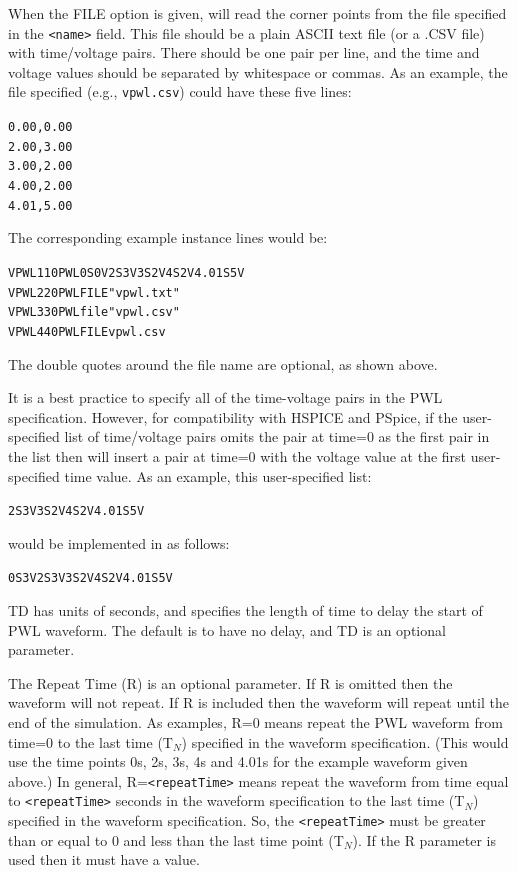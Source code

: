 When the FILE option is given, \Xyce{} will read the corner points
from the file specified in the \texttt{<name>} field.  This file
should be a plain ASCII text file (or a .CSV file) with time/voltage pairs.  
There should be one pair per line, and the time and voltage values should be
separated by whitespace or commas. As an example, the file 
specified (e.g., \texttt{vpwl.csv}) could have these five lines:
\begin{alltt}
0.00, 0.00
2.00, 3.00
3.00, 2.00
4.00, 2.00
4.01, 5.00
\end{alltt}
The corresponding example instance lines would be:
\begin{alltt}
VPWL1 1 0 PWL 0S 0V  2S 3V  3S 2V  4S 2V  4.01S 5V
VPWL2 2 0 PWL FILE "vpwl.txt"
VPWL3 3 0 PWL file "vpwl.csv"
VPWL4 4 0 PWL FILE vpwl.csv
\end{alltt}

The double quotes around the file name are optional, as shown above.

It is a best practice to specify all of the time-voltage pairs in the PWL specification.
However, for compatibility with HSPICE and PSpice, if the user-specified list of 
time/voltage pairs omits the pair at time=0 as the first pair in the list then \Xyce{} 
will insert a pair at time=0 with the voltage value at the first user-specified time value.  
As an example, this user-specified list:
\begin{alltt}
2S 3V  3S 2V  4S 2V  4.01S 5V
\end{alltt}
would be implemented in \Xyce{} as follows:  
\begin{alltt} 
0S 3V  2S 3V  3S 2V  4S 2V  4.01S 5V
\end{alltt}

TD has units of seconds, and specifies the length of time to delay
the start of PWL waveform.  The default is to have no delay, and TD is 
an optional parameter.

The Repeat Time (R) is an optional parameter.  If R is omitted then the waveform
will not repeat.  If R is included then the waveform will repeat until the end
of the simulation.  As examples, R=0 means repeat the PWL waveform from time=0
to the last time (T$_N$) specified in the waveform specification. (This would use the
time points 0s, 2s, 3s, 4s and 4.01s for the example waveform given above.)
In general, R=\texttt{<repeatTime>} means repeat the waveform from time equal to
\texttt{<repeatTime>} seconds in the waveform specification to the last time (T$_N$)
specified in the waveform specification.  So, the \texttt{<repeatTime>} must be 
greater than or equal to 0 and less than the last time point (T$_N$).
If the R parameter is used then it must have a value.  


